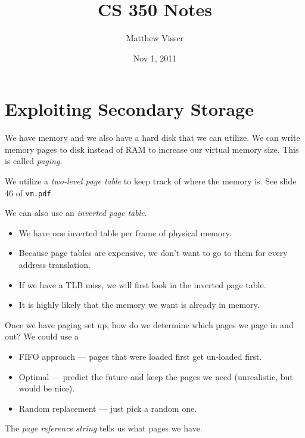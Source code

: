 \documentclass[12pt]{article}
\begin{document}
\title{CS 350 Notes}
\author{Matthew Visser}
\date{Nov  1, 2011}
\maketitle

\section{Exploiting Secondary Storage}

We have memory and we also have a hard disk that we can utilize.  We can write
memory pages to disk instead of RAM to increase our virtual memory size. This is
called \emph{paging}.

We utilize a \emph{two-level page table} to keep track of where the memory is.
See slide 46 of \texttt{vm.pdf}.

We can also use an \emph{inverted page table}.
\begin{itemize}
	\item We have one inverted table per frame of physical memory. 
	\item Because page tables are expensive, we don't want to go to them for
		every address translation. 
	\item If we have a TLB miss, we will first look in the inverted page table.
	\item It is highly likely that the memory we want is already in memory.
\end{itemize}

Once we have paging set up, how do we determine which pages we page in and out?
We could use a
\begin{itemize}
	\item FIFO approach --- pages that were loaded first get un-loaded first.
	\item Optimal --- predict the future and keep the pages we need
		(unrealistic, but would be nice).
	\item Random replacement --- just pick a random one.
\end{itemize}
The \emph{page reference string} tells us what pages we have.
\end{document}
